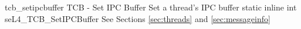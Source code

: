%
%
%
%

\apidoc
{tcb_setipcbuffer}
{TCB - Set IPC Buffer}
{Set a thread's IPC buffer}
{static inline int seL4\_TCB\_SetIPCBuffer}
{
}
{\errorenumdesc}
{See Sections \ref{sec:threads} and \ref{sec:messageinfo}}
